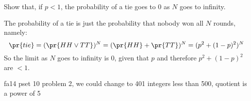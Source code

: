 \documentclass[handout]{mcs}
\begin{document}
\begin{problem}
\begin{solution}
\end{solution}

\ppart
Show that, if $p<1$, the probability of a tie goes to 0 as $N$ goes to infinity.

\begin{solution}

The probability of a tie is just the probability that nobody won all $N$ rounds, namely:
\[
\pr{tie} = (\pr{HH \lor TT})^N = (\pr{HH} + \pr{TT})^N = (p^2 + (1-p)^2)^N
\]
So the limit as $N$ goes to infinity is 0, given that $p$ and
therefore $p^2 + (1-p)^2$ are $< 1$.

\end{solution}

\eparts

\end{problem}



\begin{staffnotes}
fa14 pset 10 problem 2, we could change to 401 integers less than 500,
quotient is a power of 5
\end{staffnotes}
\end{document}
